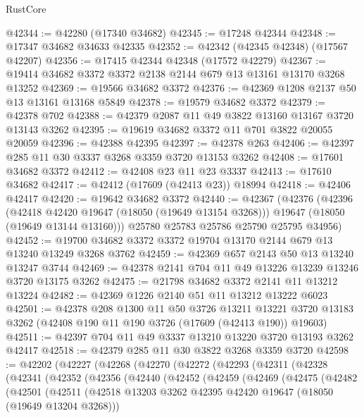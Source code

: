 \begin{lexlean}{RustCore}
\begin{coremodule}
@42344 := @42280 (@17340 @34682)
@42345 := @17248 @42344
@42348 := @17347 @34682 @34633 @42335
@42352 := @42342 (@42345 @42348) (@17567 @42207)
@42356 := @17415 @42344 @42348 (@17572 @42279)
@42367 := @19414 @34682 @3372 @3372 @2138 @2144 @679 @13 @13161 @13170 @3268 @13252
@42369 := @19566 @34682 @3372
@42376 := @42369 @1208 @2137 @50 @13 @13161 @13168 @5849
@42378 := @19579 @34682 @3372
@42379 := @42378 @702
@42388 := @42379 @2087 @11 @49 @3822 @13160 @13167 @3720 @13143 @3262
@42395 := @19619 @34682 @3372 @11 @701 @3822 @20055 @20059
@42396 := @42388 @42395
@42397 := @42378 @263
@42406 := @42397 @285 @11 @30 @3337 @3268 @3359 @3720 @13153 @3262
@42408 := @17601 @34682 @3372
@42412 := @42408 @23 @11 @23 @3337
@42413 := @17610 @34682
@42417 := @42412 (@17609 (@42413 @23)) @18994
@42418 := @42406 @42417
@42420 := @19642 @34682 @3372
@42440 := @42367
    (@42376
      (@42396
        (@42418 @42420 @19647 (@18050 (@19649 @13154 @3268)))
        @19647
        (@18050 (@19649 @13144 @13160)))
      @25780
      @25783
      @25786
      @25790
      @25795
      @34956)
@42452 := @19700 @34682 @3372 @3372 @19704 @13170 @2144 @679 @13 @13240 @13249 @3268 @3762
@42459 := @42369 @657 @2143 @50 @13 @13240 @13247 @3744
@42469 := @42378 @2141 @704 @11 @49 @13226 @13239 @13246 @3720 @13175 @3262
@42475 := @21798 @34682 @3372 @2141 @11 @13212 @13224
@42482 := @42369 @1226 @2140 @51 @11 @13212 @13222 @6023
@42501 := @42378
    @208
    @1300
    @11
    @50
    @3726
    @13211
    @13221
    @3720
    @13183
    @3262
    (@42408 @190 @11 @190 @3726 (@17609 (@42413 @190)) @19603)
@42511 := @42397 @704 @11 @49 @3337 @13210 @13220 @3720 @13193 @3262 @42417
@42518 := @42379 @285 @11 @30 @3822 @3268 @3359 @3720
@42598 := @42202
    (@42227
      (@42268
        (@42270
          (@42272
            (@42293
              (@42311
                (@42328
                  (@42341
                    (@42352
                      (@42356
                        (@42440
                          (@42452
                            (@42459
                              (@42469
                                (@42475
                                  (@42482
                                    (@42501
                                      (@42511
                                        (@42518
                                          @13203
                                          @3262
                                          @42395
                                          @42420
                                          @19647
                                          (@18050 (@19649 @13204 @3268)))

\end{coremodule}
\end{lexlean}
